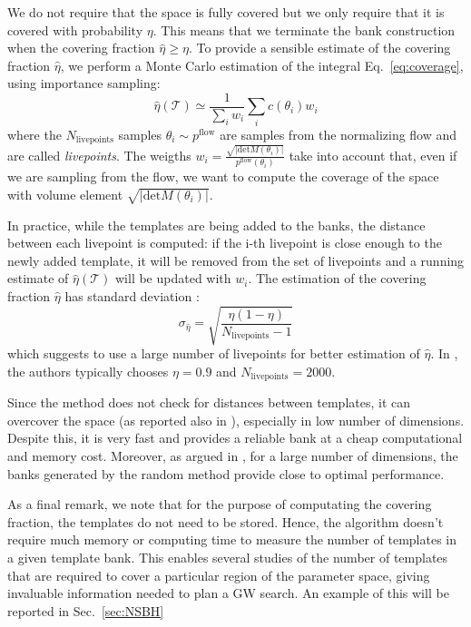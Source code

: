 \documentclass[twocolumn,showpacs,preprintnumbers,nofootinbib,prd,
superscriptaddress,10pt]{revtex4-2}
\begin{document}
We do not require that the space is fully covered but we only require that it is covered with probability $\eta$. This means that we terminate the bank construction when the covering fraction $\hat{\eta} \geq \eta$.
To provide a sensible estimate of the covering fraction $\hat{\eta}$, we perform a Monte Carlo estimation of the integral Eq.~\eqref{eq:coverage}, using importance sampling:
\begin{equation}\label{eq:coverage}
	\hat{\eta}(\mathcal{T}) \simeq \frac{1}{\sum_i w_i} \sum_i c(\theta_i) w_i 
\end{equation}
where the $N_\text{livepoints}$ samples $\theta_i \sim p^\text{flow}$ are samples from the normalizing flow and are called {\it livepoints}.
The weigths $w_i = \frac{\sqrt{|\text{det}M(\theta_i)|}}{p^\text{flow}(\theta_i)}$ take into account that, even if we are sampling from the flow, we want to compute the coverage of the space with volume element $\sqrt{|\text{det}M(\theta_i)|}$.

In practice, while the templates are being added to the banks, the distance between each livepoint is computed: if the i-th livepoint is close enough to the newly added template, it will be removed from the set of livepoints and a running estimate of $\hat{\eta}(\mathcal{T})$ will be updated with $w_i$.
The estimation of the covering fraction $\hat{\eta}$ has standard deviation \cite[App. A]{Coogan:2022qxs}:
\begin{equation}\label{eq:variance_coverage}
	\sigma_{\hat{\eta}} = \sqrt{\frac{\eta(1-\eta)}{N_\text{livepoints}-1}}
\end{equation}
which suggests to use a large number of livepoints for better estimation of $\hat{\eta}$.
In \cite{Coogan:2022qxs}, the authors typically chooses $\eta = 0.9$ and $N_\text{livepoints} = 2000$.

Since the method does not check for distances between templates, it can overcover the space (as reported also in \cite{Messenger:2008ta, Coogan:2022qxs}), especially in low number of dimensions.
Despite this, it is very fast and provides a reliable bank at a cheap computational and memory cost.
Moreover, as argued in \cite{Messenger:2008ta, Allen:2021yuy, Allen:2022lqr}, for a large number of dimensions, the banks generated by the random method provide close to optimal performance.

As a final remark, we note that for the purpose of computating the covering fraction, the templates do not need to be stored. Hence, the algorithm doesn't require much memory or computing time to measure the number of templates in a given template bank.
This enables several studies of the number of templates that are required to cover a particular region of the parameter space, giving invaluable information needed to plan a GW search. An example of this will be reported in Sec.~\ref{sec:NSBH}
\end{document}

